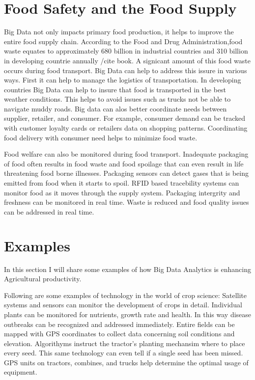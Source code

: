 \documentclass[sigconf]{acmart}
\begin{document}
\section{Food Safety and the Food Supply}

Big Data not only impacts primary food production, it helps to improve the entire food supply chain. According to the Food and Drug Administration,food waste equates to approximately 680 billion in industrial countries and 310 billion in developing countrie annually /cite {book}. A signicant amount of this food waste occurs during food transport. Big Data can help to address this issure in various ways. First it can help to manage the logistics of transportation. In developing countries Big Data can help to insure that food is transported in the best weather conditions. This helps to avoid issues such as trucks not be able to navigate muddy roads. Big data can alos better coordinate needs between supplier, retailer, and consumer. For example, consumer demand can be tracked with customer loyalty cards or retailers data on shopping patterns. Coordinating food delivery with consumer need helps to minimize food waste.

Food welfare can also be monitored during food transport.
Inadequate packaging of food often results in food waste and food spoilage that can even result in life threatening food borne illnesses. Packaging sensors can detect gases that is being emitted from food when it starts to spoil. RFID based tracebility systems can monitor food as it moves through the supply system. Packaging intergrity and freshness can be monitored in real time. Waste is reduced and food quality issues can be addressed in real time. \cite{www-google1} 

\section {Examples}

In this section I will share some examples of how Big Data Analytics is enhancing Agricultural productivity.

Following are some examples of technology in the world of crop science: Satellite systems and sensors can monitor the development of crops in detail. Individual plants can be monitored for nutrients, growth rate and health. In this way disease outbreaks can be recognized and addressed immediately.  Entire fields can be mapped with GPS coordinates to collect data concerning soil conditions and elevation. Algorithyms instruct the tractor's planting mechansim where to place every seed. This same technology can even tell if a single seed has been missed. GPS units on tractors, combines, and trucks help determine the optimal usage of equipment.
\end{document}
